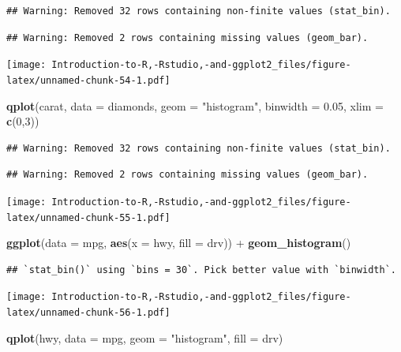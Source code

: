 \documentclass[]{book}
\newenvironment{Shaded}{\begin{snugshade}}{\end{snugshade}}
\newcommand{\KeywordTok}[1]{\textcolor[rgb]{0.13,0.29,0.53}{\textbf{{#1}}}}
\newcommand{\DataTypeTok}[1]{\textcolor[rgb]{0.13,0.29,0.53}{{#1}}}
\newcommand{\DecValTok}[1]{\textcolor[rgb]{0.00,0.00,0.81}{{#1}}}
\newcommand{\FloatTok}[1]{\textcolor[rgb]{0.00,0.00,0.81}{{#1}}}
\newcommand{\StringTok}[1]{\textcolor[rgb]{0.31,0.60,0.02}{{#1}}}
\newcommand{\NormalTok}[1]{{#1}}
\begin{document}
\begin{verbatim}
## Warning: Removed 32 rows containing non-finite values (stat_bin).
\end{verbatim}

\begin{verbatim}
## Warning: Removed 2 rows containing missing values (geom_bar).
\end{verbatim}

\texttt{[image: Introduction-to-R,-Rstudio,-and-ggplot2\_files/figure-latex/unnamed-chunk-54-1.pdf]}

\begin{Shaded}
\begin{Highlighting}[]
\KeywordTok{qplot}\NormalTok{(carat, }\DataTypeTok{data =} \NormalTok{diamonds, }\DataTypeTok{geom =} \StringTok{"histogram"}\NormalTok{, }\DataTypeTok{binwidth =} \FloatTok{0.05}\NormalTok{, }\DataTypeTok{xlim =} \KeywordTok{c}\NormalTok{(}\DecValTok{0}\NormalTok{,}\DecValTok{3}\NormalTok{))}
\end{Highlighting}
\end{Shaded}

\begin{verbatim}
## Warning: Removed 32 rows containing non-finite values (stat_bin).
\end{verbatim}

\begin{verbatim}
## Warning: Removed 2 rows containing missing values (geom_bar).
\end{verbatim}

\texttt{[image: Introduction-to-R,-Rstudio,-and-ggplot2\_files/figure-latex/unnamed-chunk-55-1.pdf]}

\begin{Shaded}
\begin{Highlighting}[]
\KeywordTok{ggplot}\NormalTok{(}\DataTypeTok{data =} \NormalTok{mpg, }\KeywordTok{aes}\NormalTok{(}\DataTypeTok{x =} \NormalTok{hwy, }\DataTypeTok{fill =} \NormalTok{drv)) +}\StringTok{ }\KeywordTok{geom_histogram}\NormalTok{() }
\end{Highlighting}
\end{Shaded}

\begin{verbatim}
## `stat_bin()` using `bins = 30`. Pick better value with `binwidth`.
\end{verbatim}

\texttt{[image: Introduction-to-R,-Rstudio,-and-ggplot2\_files/figure-latex/unnamed-chunk-56-1.pdf]}

\begin{Shaded}
\begin{Highlighting}[]
\KeywordTok{qplot}\NormalTok{(hwy, }\DataTypeTok{data =} \NormalTok{mpg, }\DataTypeTok{geom =} \StringTok{"histogram"}\NormalTok{, }\DataTypeTok{fill =} \NormalTok{drv)}
\end{Highlighting}
\end{Shaded}
\end{document}
